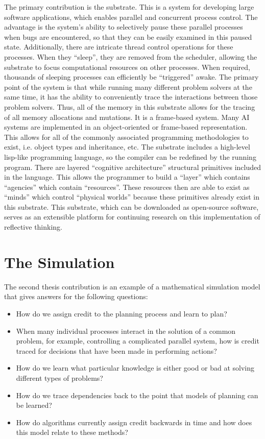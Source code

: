 The primary contribution is the substrate.  This is a system for
developing large software applications, which enables parallel and
concurrent process control.  The advantage is the system's ability to
selectively pause these parallel processes when bugs are encountered,
so that they can be easily examined in this paused state.
Additionally, there are intricate thread control operations for these
processes.  When they ``sleep'', they are removed from the scheduler,
allowing the substrate to focus computational resources on other
processes.  When required, thousands of sleeping processes can
efficiently be ``triggered'' awake.  The primary point of the system
is that while running many different problem solvers at the same time,
it has the ability to conveniently trace the interactions between
those problem solvers.  Thus, all of the memory in this substrate
allows for the tracing of all memory allocations and mutations.  It is
a frame-based system.  Many AI systems are implemented in an
object-oriented or frame-based representation.  This allows for all of
the commonly associated programming methodologies to exist, i.e.
object types and inheritance, etc.  The substrate includes a
high-level lisp-like programming language, so the compiler can be
redefined by the running program.  There are layered ``cognitive
architecture'' structural primitives included in the language.  This
allows the programmer to build a ``layer'' which contains ``agencies''
which contain ``resources''.  These resources then are able to exist
as ``minds'' which control ``physical worlds'' because these
primitives already exist in this substrate.  This substrate, which can
be downloaded as open-source software, serves as an extensible
platform for continuing research on this implementation of reflective
thinking.

\section{The Simulation}

The second thesis contribution is an example of a mathematical
simulation model that gives answers for the following questions:
\begin{itemize}
\item How do we assign credit to the planning process and learn to
  plan?
\item When many individual processes interact in the solution of a
  common problem, for example, controlling a complicated parallel
  system, how is credit traced for decisions that have been made in
  performing actions?
\item How do we learn what particular knowledge is either good or bad
  at solving different types of problems?
\item How do we trace dependencies back to the point that models of
  planning can be learned?
\item How do algorithms currently assign credit backwards in time and
  how does this model relate to these methods?
\end{itemize}

